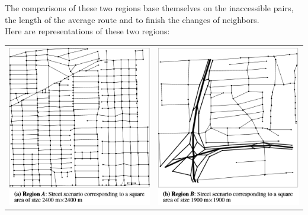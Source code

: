 The comparisons of these two regions base themselves on the inaccessible pairs, the length of the average route and to finish the changes of neighbors.\\

Here are representations of these two regions:\\

\begin{tabular}{cc}
   \includegraphics{../images/cityA.png} &
   \includegraphics{../images/cityB.png}
\end{tabular}

\newpage

